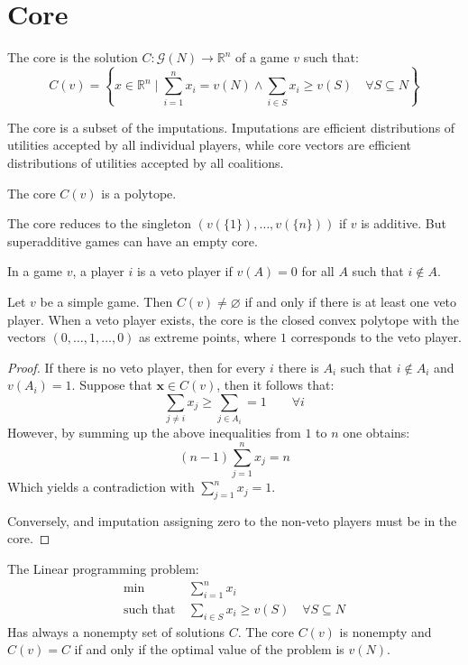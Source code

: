 \section{Core}
\begin{definition}
    The core is the solution $C:\mathcal{G}(N)\rightarrow\mathbb{R}^n$ of a game $v$ such that: 
    \[C(v)=\left\{x\in\mathbb{R}^n\mid\sum_{i=1}^{n}x_i=v(N)\land\sum_{i\in S}x_i\geq v(S)\quad\forall S\subseteq N\right\}\]
\end{definition}
\noindent The core is a subset of the imputations. 
Imputations are efficient distributions of utilities accepted by all individual players, while core vectors are efficient distributions of utilities accepted by all coalitions. 
\begin{proposition}
    The core $C(v)$ is a polytope.
\end{proposition}
\noindent The core reduces to the singleton $(v(\{1\}),\dots,v(\{n\}))$ if $v$ is additive. 
But superadditive games can have an empty core. 
\begin{definition}
    In a game $v$, a player $i$ is a veto player if $v(A)=0$ for all $A$ such that $i\notin A$. 
\end{definition}
\begin{theorem}
    Let $v$ be a simple game. 
    Then $C(v)\neq\varnothing$ if and only if there is at least one veto player. 
    When a veto player exists, the core is the closed convex polytope with the vectors $(0,\dots,1,\dots,0)$ as extreme points, where $1$ corresponds to the veto player. 
\end{theorem}
\begin{proof}
    If there is no veto player, then for every $i$ there is $A_i$ such that $i\notin A_i$ and $v(A_i)=1$. 
    Suppose that $\mathbf{x}\in C(v)$, then it follows that: 
    \[\sum_{j\neq i}x_j\geq\sum_{j\in A_i}=1\qquad\forall i\]
    However, by summing up the above inequalities from $1$ to $n$ one obtains: 
    \[(n-1)\sum_{j=1}^{n}x_j=n\]
    Which yields a contradiction with $\sum_{j=1}^{n}x_j=1$.

    Conversely, and imputation assigning zero to the non-veto players must be in the core. 
\end{proof}
\begin{theorem}
    The Linear programming problem: 
    \begin{align*} 
        \min\:&\sum_{i=1}^{n}x_i \\
        \text{such that}    \:&\sum_{i\in S}x_i\geq v(S)\quad\forall S \subseteq N
    \end{align*}
    Has always a nonempty set of solutions $C$. 
    The core $C(v)$ is nonempty and $C(v)=C$ if and only if the optimal value of the problem is $v(N)$. 
\end{theorem}
